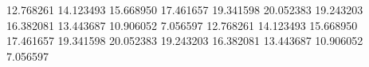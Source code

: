 12.768261
14.123493
15.668950
17.461657
19.341598
20.052383
19.243203
16.382081
13.443687
10.906052
7.056597
12.768261
14.123493
15.668950
17.461657
19.341598
20.052383
19.243203
16.382081
13.443687
10.906052
7.056597
